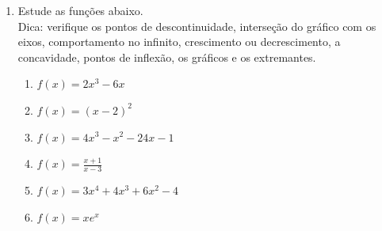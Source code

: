 \documentclass[oneside,a4paper,12pt]{article}
\begin{document}
\begin{enumerate}
    \item Estude as funções abaixo.\\ Dica: verifique os pontos de descontinuidade, interseção do gráfico com os eixos, comportamento no infinito, crescimento ou decrescimento, a concavidade, pontos de inflexão, os gráficos e os extremantes.
        \begin{enumerate}
         \item $f(x) = 2x^3 - 6x$
         \item $f(x) = (x-2)^2$
         \item $f(x) = 4x^3 - x^2 - 24x - 1$
         \item $f(x) = \displaystyle \frac{x + 1}{x -3}$
         \item $f(x) = 3x^4 + 4x^3 + 6x^2 - 4$
         \item $f(x) = xe^x$
        \end{enumerate}



\end{enumerate}


	
\end{document}
